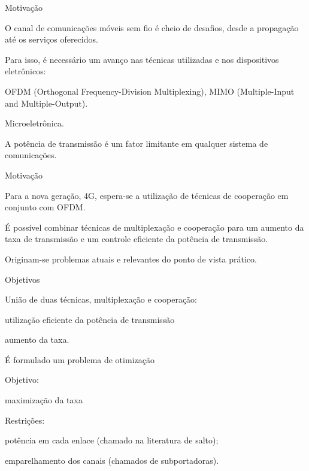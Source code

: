 \begin{frame}{Motivação}
 \begin{bigitem}
  \item O canal de comunicações móveis sem fio é cheio de desafios, desde a propagação até os serviços oferecidos.
  \item Para isso, é necessário um avanço nas técnicas utilizadas e nos dispositivos eletrônicos:
  \begin{bigitem}
    \item OFDM (Orthogonal Frequency-Division Multiplexing), MIMO (Multiple-Input and Multiple-Output).
    \item Microeletrônica.
  \end{bigitem}
  \item A potência de transmissão é um fator limitante em qualquer sistema de comunicações. 
 \end{bigitem}
\end{frame}

\begin{frame}{Motivação}
 \begin{bigitem}
  \item Para a nova geração, 4G, espera-se a utilização de técnicas de cooperação em conjunto com OFDM.
  \item É possível combinar técnicas de multiplexação e cooperação para um aumento da taxa de transmissão e um controle eficiente da potência de transmissão.
  \item Originam-se problemas atuais e relevantes do ponto de vista prático.
 \end{bigitem}
\end{frame}

\begin{frame}{Objetivos}
 \begin{bigitem}
  \item União de duas técnicas, multiplexação e cooperação:
  \begin{bigitem}
    \item utilização eficiente da potência de transmissão
    \item aumento da taxa.  
  \end{bigitem}
  \item É formulado um problema de otimização
  \begin{bigitem}
    \item  Objetivo:
    \begin{bigitem}
      \item  maximização da taxa
    \end{bigitem}
    \item Restrições:
    \begin{bigitem}
      \item potência em cada enlace (chamado na literatura de salto);
      \item emparelhamento dos canais (chamados de subportadoras).
    \end{bigitem}
  \end{bigitem}  
 \end{bigitem}
\end{frame}

